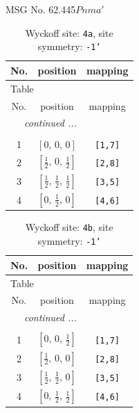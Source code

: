 \documentclass[fleqn,8pt]{jsarticle}
\begin{document}
\setcounter{MaxMatrixCols}{32}

\renewcommand{\tablename}{Table~}
\renewcommand{\figurename}{Figure~}
\begin{center}
\LARGE
MSG No. 62.445\quad$Pnma'$
\end{center}
\renewcommand{\arraystretch}{1.2}
\begin{longtable}{ccc}
\caption{Wyckoff site: {\tt 4a}, site symmetry: {\tt -1'}}
 \\
 \hline \hline
No. & position & mapping \\ \hline \endfirsthead

\multicolumn{2}{l}{\tablename\ \thetable{}} \\
 \hline \hline
No. & position & mapping \\ \hline \endhead

 \hline \hline
\multicolumn{2}{r}{\footnotesize\it continued ...} \\ \endfoot

 \hline \hline
\multicolumn{2}{r}{} \\ \endlastfoot

1 & $\left[ 0,\, 0,\, 0 \right]$ & {\tt [1,7]} \\ \hline
2 & $\left[ \frac{1}{2},\, 0,\, \frac{1}{2} \right]$ & {\tt [2,8]} \\ \hline
3 & $\left[ \frac{1}{2},\, \frac{1}{2},\, \frac{1}{2} \right]$ & {\tt [3,5]} \\ \hline
4 & $\left[ 0,\, \frac{1}{2},\, 0 \right]$ & {\tt [4,6]} \\
\end{longtable}
\renewcommand{\arraystretch}{1.2}
\begin{longtable}{ccc}
\caption{Wyckoff site: {\tt 4b}, site symmetry: {\tt -1'}}
 \\
 \hline \hline
No. & position & mapping \\ \hline \endfirsthead

\multicolumn{2}{l}{\tablename\ \thetable{}} \\
 \hline \hline
No. & position & mapping \\ \hline \endhead

 \hline \hline
\multicolumn{2}{r}{\footnotesize\it continued ...} \\ \endfoot

 \hline \hline
\multicolumn{2}{r}{} \\ \endlastfoot

1 & $\left[ 0,\, 0,\, \frac{1}{2} \right]$ & {\tt [1,7]} \\ \hline
2 & $\left[ \frac{1}{2},\, 0,\, 0 \right]$ & {\tt [2,8]} \\ \hline
3 & $\left[ \frac{1}{2},\, \frac{1}{2},\, 0 \right]$ & {\tt [3,5]} \\ \hline
4 & $\left[ 0,\, \frac{1}{2},\, \frac{1}{2} \right]$ & {\tt [4,6]} \\
\end{longtable}
\end{document}
